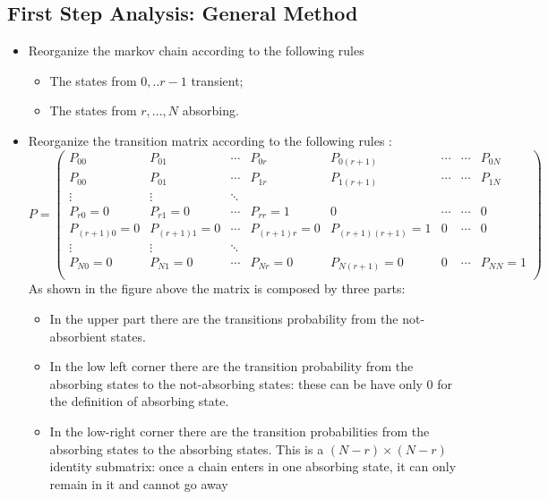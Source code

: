 \subsection{First Step Analysis: General Method}
\begin{itemize}
	\item Reorganize the markov chain according to the following rules
	\begin{itemize}
		\item The states from $0,..r-1$ transient;
		\item The states from $r,...,N$ absorbing.
	\end{itemize}

	\item  Reorganize the transition matrix according to the following rules :
     \begin{equation} P=\begin{pmatrix}
     P_{00} & P_{01} & \cdots & P_{0r}& P_{0(r+1)} &\cdots & \cdots &P_{0N} \\
     P_{00} & P_{01} & \cdots & P_{1r}& P_{1(r+1)}& \cdots & \cdots & P_{1N}\\
     \vdots & \vdots & \ddots  \\
     P_{r0}=0 & P_{r1}=0& \cdots &P_{rr}=1& 0 & \cdots & \cdots &0\\
     P_{(r+1)0}=0 & P_{(r+1)1}=0& \cdots &P_{(r+1)r}=0& P_{(r+1)(r+1)}=1& 0&  \cdots&  0\\
     \vdots & \vdots & \ddots  \\
     P_{N0}=0 & P_{N1}=0& \cdots &P_{Nr}=0& P_{N(r+1)}=0& 0&  \cdots&  P_{NN}=1\\

     \end{pmatrix}
     \end{equation}
     As shown in the figure above the matrix is composed by three parts:
     \begin{itemize}
     	\item In the upper part there are the transitions probability from the not-absorbient states.
     	\item In the low left corner there are the transition probability from  the absorbing states to the not-absorbing states: these can be have only 0 for the definition of absorbing state.
     	\item In the low-right corner there are the transition probabilities from  the absorbing states to the absorbing states. This is a $(N-r) \times(N-r)$ identity submatrix: once a chain enters in one absorbing state, it can only remain in it and cannot go away


\end{itemize}
\end{itemize}
